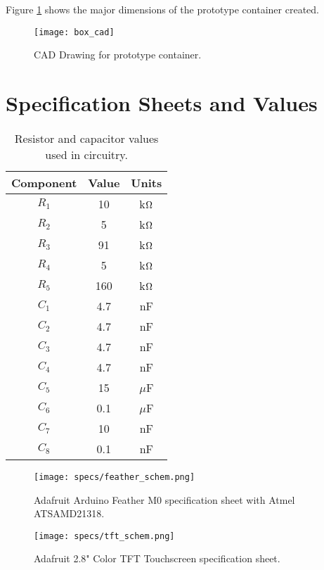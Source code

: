Figure \ref{fig:cad-drawing} shows the major dimensions of the prototype container created.

\begin{figure}[h]
\begin{center}
    \texttt{[image: box\_cad]}
    \caption{CAD Drawing for prototype container.}
    \label{fig:cad-drawing}
\end{center}    
\end{figure}


\section{Specification Sheets and Values} \label{app:spec-sheets}

\begin{table}
\begin{center}
\begin{tabular}{|c|c|c|}\hline
    Component & Value & Units \\\hline
    $R_1$ & 10 & k$\ohm$ \\\hline
    $R_2$ & 5 & k$\ohm$ \\\hline
    $R_3$ & 91 & k$\ohm$ \\\hline
    $R_4$ & 5 & k$\ohm$ \\\hline
    $R_5$ & 160 & k$\ohm$ \\\hline
    $C_1$ & 4.7& nF \\\hline
    $C_2$ & 4.7 & nF \\\hline
    $C_3$ & 4.7& nF \\\hline
    $C_4$ & 4.7 & nF \\\hline
    $C_5$ & 15 & $\mu$F \\\hline
    $C_6$ & 0.1 & $\mu$F \\\hline
    $C_7$ & 10 & nF \\\hline
    $C_8$ & 0.1 & nF \\\hline
\end{tabular}  
\caption{Resistor and capacitor values used in circuitry.}
\label{tab:schem-vals} 
\end{center}
\end{table}

\begin{figure}[h]
    \texttt{[image: specs/feather\_schem.png]}
    \caption{\label{feather_schem}Adafruit Arduino Feather M0 specification sheet with Atmel ATSAMD21318.}
\end{figure}

\begin{figure}[h]
    \texttt{[image: specs/tft\_schem.png]}
    \caption{\label{tftschem}Adafruit 2.8" Color TFT Touchscreen specification sheet.}
\end{figure}

